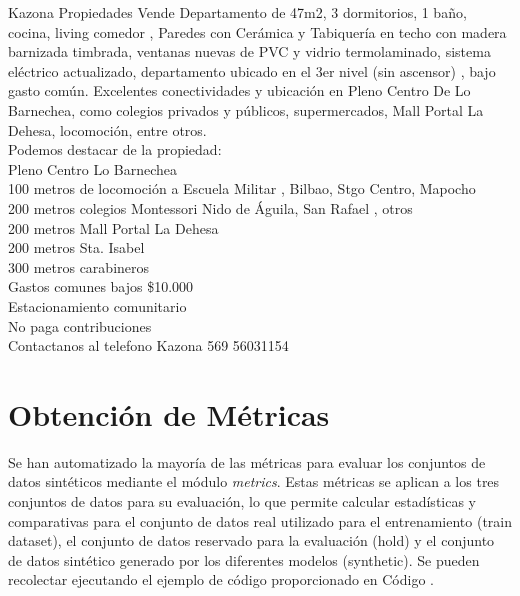 \begin{tcolorbox}[colback=white,colframe=black!50!white,title=Respuesta esperada]
\footnotesize
Kazona Propiedades Vende Departamento de 47m2, 3 dormitorios, 1 ba\~no, cocina, living comedor , Paredes con Cer\'amica y Tabiquer\'ia en techo con madera barnizada timbrada, ventanas nuevas de PVC y vidrio termolaminado, sistema el\'ectrico actualizado, departamento ubicado en el 3er nivel (sin ascensor) , bajo gasto com\'un. Excelentes conectividades y ubicaci\'on en Pleno Centro De Lo Barnechea, como colegios privados y p\'ublicos, supermercados, Mall Portal La Dehesa, locomoci\'on, entre otros.\\
Podemos destacar de la propiedad:\\
Pleno Centro Lo Barnechea\\
100 metros de locomoci\'on a Escuela Militar , Bilbao, Stgo Centro, Mapocho\\
200 metros colegios Montessori Nido de \'Aguila, San Rafael , otros\\
200 metros Mall Portal La Dehesa\\
200 metros Sta. Isabel\\
300 metros carabineros\\
Gastos comunes bajos  \$10.000\\
Estacionamiento comunitario\\
No paga contribuciones\\
Contactanos al telefono Kazona 569 56031154
\end{tcolorbox}

\section{Obtención de Métricas}

Se han automatizado la mayoría de las métricas para evaluar los conjuntos de datos sintéticos mediante el módulo \emph{metrics}. Estas métricas se aplican a los tres conjuntos de datos para su evaluación, lo que permite calcular estadísticas y comparativas para el conjunto de datos real utilizado para el entrenamiento (train dataset), el conjunto de datos reservado para la evaluación (hold) y el conjunto de datos sintético generado por los diferentes modelos (synthetic). Se pueden recolectar ejecutando el ejemplo de código proporcionado en Código .


